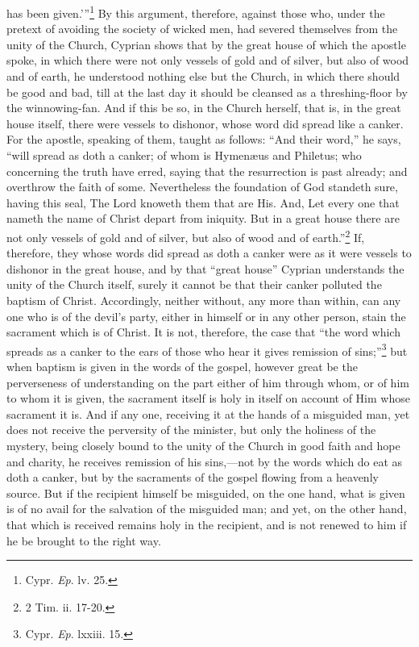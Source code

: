 has been given.’''\footnote{\par  Cypr. \emph{Ep}. lv. 25.} By this argument, therefore, against those who, under the pretext of avoiding the society of wicked men, had severed themselves from the unity of the Church, Cyprian shows that by the great house of which the apostle spoke, in which there were not only vessels of gold and of silver, but also of wood and of earth, he understood nothing else but the Church, in which there should be good and bad, till at the last day it should be cleansed as a threshing-floor by the winnowing-fan. And if this be so, in the Church herself, that is, in the great house itself, there were vessels to dishonor, whose word did spread like a canker. For the apostle, speaking of them, taught as follows: ``And their word,'' he says, ``will spread as doth a canker; of whom is Hymenæus and Philetus; who concerning the truth have erred, saying that the resurrection is past already; and overthrow the faith of some. Nevertheless the foundation of God standeth sure, having this seal, The Lord knoweth them that are His. And, Let every one that nameth the name of Christ depart from iniquity. But in a great house there are not only vessels of gold and of silver, but also of wood and of earth.''\footnote{\par  2 Tim. ii. 17-20.} If, therefore, they whose words did spread as doth a canker were as it were vessels to dishonor in the great house, and by that ``great house'' Cyprian understands the unity of the Church itself, surely it cannot be that their canker polluted the baptism of Christ. Accordingly, neither without, any more than within, can any one who is of the devil’s party, either in himself or in any other person, stain the sacrament which is of Christ. It is not, therefore, the case that ``the word which spreads as a canker to the ears of those who hear it gives remission of sins;''\footnote{\par  Cypr. \emph{Ep}. lxxiii. 15.} but when baptism is given in the words of the gospel, however great be the perverseness of understanding on the part either of him through whom, or of him to whom it is given, the sacrament itself is holy in itself on account of Him whose sacrament it is. And if any one, receiving it at the hands of a misguided man, yet does not receive the perversity of the minister, but only the holiness of the mystery, being closely bound to the unity of the Church in good faith and hope and charity, he receives remission of his sins,—not by the words which do eat as doth a canker, but by the sacraments of the gospel flowing from a heavenly source. But if the recipient himself be misguided, on the one hand, what is given is of no avail for the salvation of the misguided man; and yet, on the other hand, that which is received remains holy in the recipient, and is not renewed to him if he be brought to the right way.

